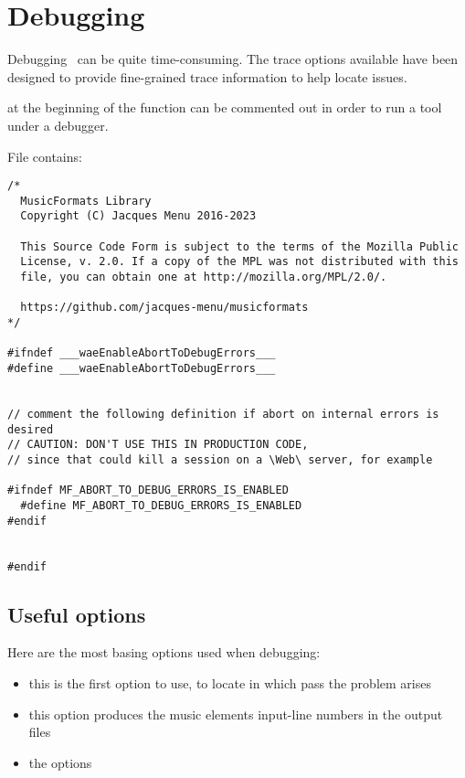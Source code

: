 

\chapter{Debugging}

Debugging \mf\ can be quite time-consuming. The trace options available have been designed to provide fine-grained trace information to help locate issues.

 at the beginning of the  function can be commented out in order to run a tool under a debugger.

File  contains:
\begin{lstlisting}[language=CPlusPlus]
/*
  MusicFormats Library
  Copyright (C) Jacques Menu 2016-2023

  This Source Code Form is subject to the terms of the Mozilla Public
  License, v. 2.0. If a copy of the MPL was not distributed with this
  file, you can obtain one at http://mozilla.org/MPL/2.0/.

  https://github.com/jacques-menu/musicformats
*/

#ifndef ___waeEnableAbortToDebugErrors___
#define ___waeEnableAbortToDebugErrors___


// comment the following definition if abort on internal errors is desired
// CAUTION: DON'T USE THIS IN PRODUCTION CODE,
// since that could kill a session on a \Web\ server, for example

#ifndef MF_ABORT_TO_DEBUG_ERRORS_IS_ENABLED
  #define MF_ABORT_TO_DEBUG_ERRORS_IS_ENABLED
#endif


#endif
\end{lstlisting}


\section{Useful options}

Here are the most basing options used when debugging:
\begin{itemize}
\item {}
	this is the first option to use, to locate in which pass the problem arises

\item {}
	this option produces the music elements input-line numbers in the output files

\item the  options

\end{itemize}


